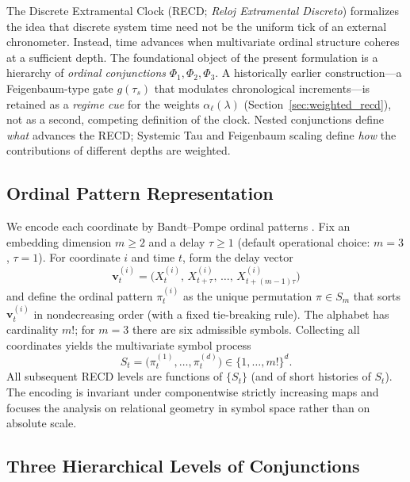 \documentclass[11pt,a4paper]{article}
\begin{document}
The Discrete Extramental Clock (RECD; \emph{Reloj Extramental Discreto})
formalizes the idea that discrete system time need not be the uniform
tick of an external chronometer. Instead, time advances when multivariate
ordinal structure coheres at a sufficient depth. The foundational object
of the present formulation is a hierarchy of \emph{ordinal conjunctions}
$\Phi_1,\Phi_2,\Phi_3$. A historically earlier construction---a
Feigenbaum-type gate $g(\tau_s)$ that modulates chronological
increments---is retained as a \emph{regime cue} for the weights
$\alpha_\ell(\lambda)$ (Section~\ref{sec:weighted_recd}), not as a second,
competing definition of the clock. Nested conjunctions define
\emph{what} advances the RECD; Systemic Tau and Feigenbaum scaling define
\emph{how} the contributions of different depths are weighted.

\subsection{Ordinal Pattern Representation}
\label{sec:ordinal_patterns}

We encode each coordinate by Bandt--Pompe ordinal patterns
\cite{BandtPompe2002,Amigo2010}. Fix an embedding dimension $m\geq 2$ and
a delay $\tau\geq 1$ (default operational choice: $m=3$, $\tau=1$). For
coordinate $i$ and time $t$, form the delay vector
\begin{equation}
\mathbf{v}^{(i)}_t
=\bigl(
X^{(i)}_{t},\,
X^{(i)}_{t+\tau},\,
\ldots,\,
X^{(i)}_{t+(m-1)\tau}
\bigr)
\end{equation}
and define the ordinal pattern $\pi^{(i)}_t$ as the unique permutation
$\pi\in S_m$ that sorts $\mathbf{v}^{(i)}_t$ in nondecreasing order
(with a fixed tie-breaking rule). The alphabet has cardinality $m!$; for
$m=3$ there are six admissible symbols. Collecting all coordinates yields
the multivariate symbol process
\begin{equation}
S_t=\bigl(\pi^{(1)}_t,\ldots,\pi^{(d)}_t\bigr)\in\{1,\ldots,m!\}^d.
\end{equation}
All subsequent RECD levels are functions of $\{S_t\}$ (and of short
histories of $S_t$). The encoding is invariant under componentwise
strictly increasing maps and focuses the analysis on relational geometry
in symbol space rather than on absolute scale.

\subsection{Three Hierarchical Levels of Conjunctions}
\label{sec:levels}
\end{document}
